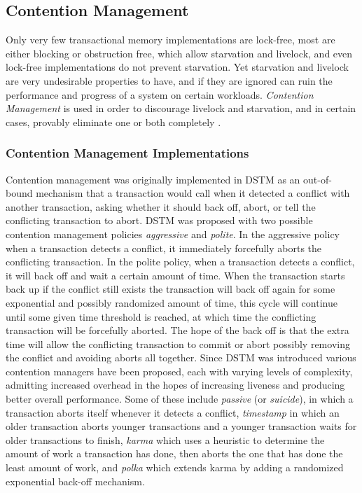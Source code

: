 \subsection{Contention Management}
Only very few transactional memory implementations are lock-free, most are either blocking or obstruction free, which allow starvation and livelock, and even lock-free implementations do not prevent starvation.
Yet starvation and livelock are very undesirable properties to have, and if they are ignored can ruin the performance and progress of a system on certain workloads.
\emph{Contention Management} is used in order to discourage livelock and starvation, and in certain cases, provably eliminate one or both completely \cite{1073863}.

\subsubsection{Contention Management Implementations}
Contention management was originally implemented in DSTM \cite{872048} as an out-of-bound mechanism that a transaction would call when it detected a conflict with another transaction, asking whether it should back off, abort, or tell the conflicting transaction to abort.
DSTM was proposed with two possible contention management policies \emph{aggressive} and \emph{polite}.  In the aggressive policy when a transaction detects a conflict, it immediately forcefully aborts the conflicting transaction.
In the polite policy, when a transaction detects a conflict, it will back off and wait a certain amount of time.
When the transaction starts back up if the conflict still exists the transaction will back off again for some exponential and possibly randomized amount of time, this cycle will continue until some given time threshold is reached, at which time the conflicting transaction will be forcefully aborted.
The hope of the back off is that the extra time will allow the conflicting transaction to commit or abort possibly removing the conflict and avoiding aborts all together.
Since DSTM was introduced various contention managers have been proposed, each with varying levels of complexity, admitting increased overhead in the hopes of increasing liveness and producing better overall performance.
Some of these include \emph{passive} (or \emph{suicide}), in which a transaction aborts itself whenever it detects a conflict, \emph{timestamp} in which an older transaction aborts younger transactions and a younger transaction waits for older transactions to finish, \emph{karma} which uses a heuristic to determine the amount of work a transaction has done, then aborts the one that has done the least amount of work, and \emph{polka} which extends karma by adding a randomized exponential back-off mechanism.

